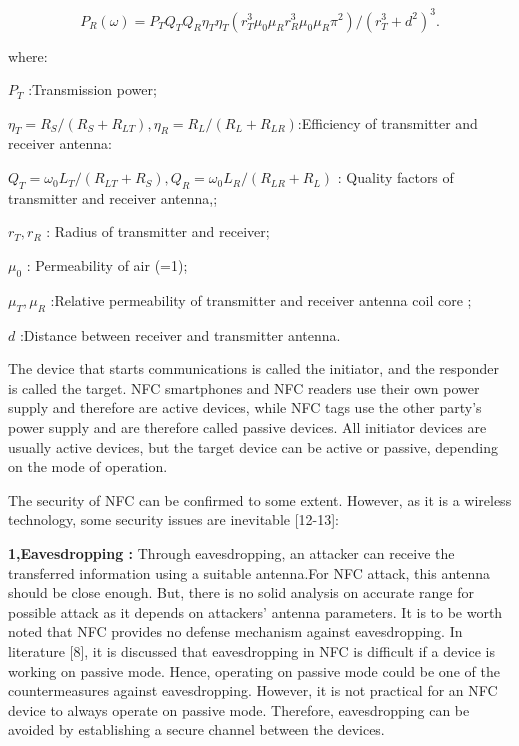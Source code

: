 \documentclass[journal]{IEEEtran}
\begin{document}
$$ P_{R}(\omega)=P_{T}Q_{T}Q_{R}\eta_{T}\eta_{T}(r_{T}^{3}\mu_{0}\mu_{R}r_{R}^{3}\mu_{0}\mu_{R}\pi^{2})/(r_{T}^{3}+d^{2})^{3}.$$

where:

$P_{T}$    :Transmission power;
           
 $\eta_{T}=R_{S}/(R_{S}+R_{LT}),\eta_{R}=R_{L}/
(R_{L}+R_{LR})$:Efficiency of transmitter and receiver antenna:
                      



$Q_{T}=\omega_{0}L_{T}/(R_{LT}+R_{S}),Q_{R}=\omega_{0}L_{R}/(R_{LR}+R_{L})$         : Quality factors of transmitter and receiver antenna,;

$r_{T},r_{R}$            : Radius of transmitter and receiver;
           
$\mu_{0}$                          :  Permeability of air (=1);
           
$\mu_{T},\mu_{R}$                        :Relative permeability of transmitter and receiver antenna coil core ;
           
$d$           :Distance between receiver and transmitter antenna.

The device that starts communications is called the initiator, and the responder is called the target. NFC smartphones and NFC readers use their own power supply and therefore are active devices, while NFC tags use the other party's power supply and are therefore called passive devices. All initiator devices are usually active devices, but the target device can be active or passive, depending on the mode of operation.

The security of NFC can be confirmed to some extent. However, as it is a wireless technology, some security issues are inevitable [12-13]:

\textbf{1,Eavesdropping :} Through eavesdropping, an attacker can receive the transferred information using a suitable antenna.For NFC attack, this antenna should be close enough. But, there is no solid analysis on accurate range
for possible attack as it depends on attackers' antenna parameters. It is to be worth noted that NFC provides no defense mechanism against eavesdropping. In literature [8], it is discussed that eavesdropping in NFC is difficult if a device is working on passive mode. Hence, operating on passive mode could be one of the countermeasures against eavesdropping. However, it is not practical for an NFC device to always operate on passive mode. Therefore, eavesdropping can be avoided by establishing a secure channel between the devices.
\end{document}
